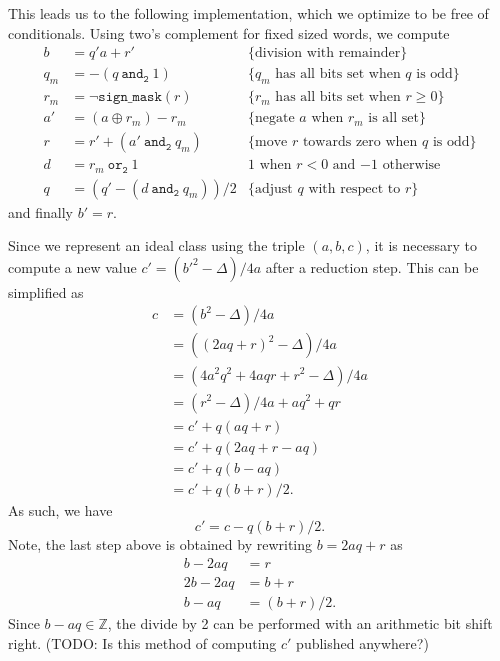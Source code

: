 \documentclass{ucalgthes1}
\theoremstyle{definition}
\newcommand{\ZZ}{\mathbb{Z}}
\newcommand{\band}{~\texttt{and}_\texttt{2}~}
\newcommand{\bor}{~\texttt{or}_\texttt{2}~}
\newcommand{\bxor}{\oplus}
\newcommand{\bnot}{\lnot}
\begin{document}
This leads us to the following implementation, which we optimize to be free of conditionals.  Using two's complement for fixed sized words, we compute 
\begin{align*}
b   &= q'a + r' & \textrm{\{division with remainder\}}\\
q_m &= -(q \band 1) & \textrm{\{$q_m$ has all bits set when $q$ is odd\}} \\
r_m &= \bnot\texttt{sign\_mask}(r) & \textrm{\{$r_m$ has all bits set when $r \ge 0$\}} \\
a'  &= (a \bxor r_m) - r_m & \textrm{\{negate $a$ when $r_m$ is all set\}} \\
r   &= r' + (a' \band q_m) & \textrm{\{move $r$ towards zero when $q$ is odd\}} \\
d   &= r_m \bor 1 & \textrm{1 when $r < 0$ and $-1$ otherwise} \\
q   &= (q' - (d \band q_m))/2 & \textrm{\{adjust $q$ with respect to $r$\}}
\end{align*}
and finally $b' = r$.

Since we represent an ideal class using the triple $(a, b, c)$, it is necessary to compute a new value $c' = (b'^2 - \Delta)/4a$ after a reduction step.  This can be simplified as
\begin{align*}
	c &= (b^2 - \Delta)/4a \\
	  &= ((2aq + r)^2 - \Delta)/4a \\
	  &= (4a^2q^2 + 4aqr + r^2 - \Delta)/4a \\
	  &= (r^2 - \Delta)/4a + aq^2 + qr \\
	  &= c' + q(aq + r) \\
	  &= c' + q(2aq + r - aq) \\
	  &= c' + q(b - aq) \\
	  &= c' + q(b + r)/2.
\end{align*}
As such, we have
\[
c' = c - q(b + r)/2.
\]
Note, the last step above is obtained by rewriting $b = 2aq + r$ as
\begin{align*}
	b - 2aq &= r \\
	2b - 2aq &= b + r \\
	b - aq &= (b+r)/2.
\end{align*}
Since $b - aq \in \ZZ$, the divide by 2 can be performed with an arithmetic bit shift right. (TODO: Is this method of computing $c'$ published anywhere?)
\end{document}
